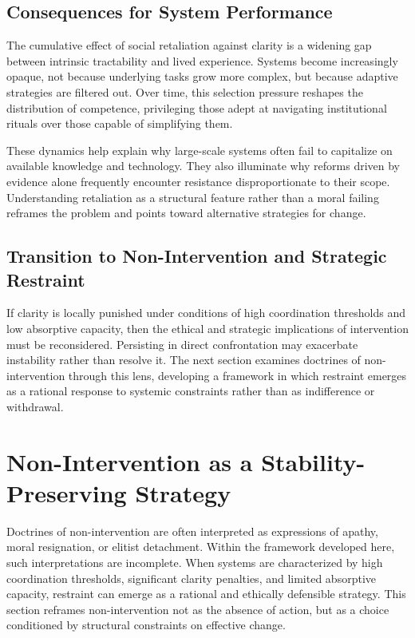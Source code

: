 \documentclass[11pt]{article}
\begin{document}
\subsection{Consequences for System Performance}

The cumulative effect of social retaliation against clarity is a widening gap between intrinsic tractability and lived experience. Systems become increasingly opaque, not because underlying tasks grow more complex, but because adaptive strategies are filtered out. Over time, this selection pressure reshapes the distribution of competence, privileging those adept at navigating institutional rituals over those capable of simplifying them.

These dynamics help explain why large-scale systems often fail to capitalize on available knowledge and technology. They also illuminate why reforms driven by evidence alone frequently encounter resistance disproportionate to their scope. Understanding retaliation as a structural feature rather than a moral failing reframes the problem and points toward alternative strategies for change.

\subsection{Transition to Non-Intervention and Strategic Restraint}

If clarity is locally punished under conditions of high coordination thresholds and low absorptive capacity, then the ethical and strategic implications of intervention must be reconsidered. Persisting in direct confrontation may exacerbate instability rather than resolve it. The next section examines doctrines of non-intervention through this lens, developing a framework in which restraint emerges as a rational response to systemic constraints rather than as indifference or withdrawal.

\section{Non-Intervention as a Stability-Preserving Strategy}

Doctrines of non-intervention are often interpreted as expressions of apathy, moral resignation, or elitist detachment. Within the framework developed here, such interpretations are incomplete. When systems are characterized by high coordination thresholds, significant clarity penalties, and limited absorptive capacity, restraint can emerge as a rational and ethically defensible strategy. This section reframes non-intervention not as the absence of action, but as a choice conditioned by structural constraints on effective change.
\end{document}

